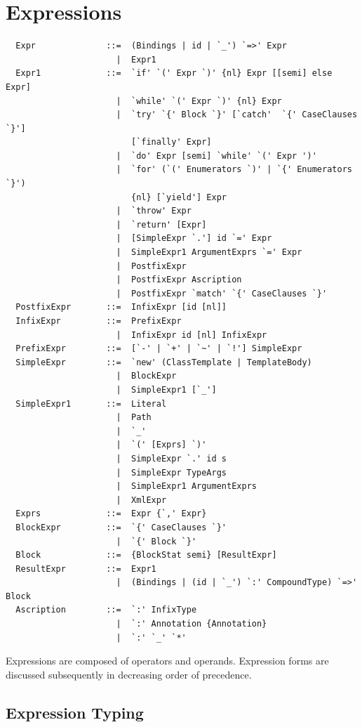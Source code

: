 \chapter{Expressions}
\label{sec:exprs}

\syntax\begin{lstlisting}
  Expr              ::=  (Bindings | id | `_') `=>' Expr
                      |  Expr1
  Expr1             ::=  `if' `(' Expr `)' {nl} Expr [[semi] else Expr]
                      |  `while' `(' Expr `)' {nl} Expr
                      |  `try' `{' Block `}' [`catch'  `{' CaseClauses `}'] 
                         [`finally' Expr]
                      |  `do' Expr [semi] `while' `(' Expr ')'
                      |  `for' (`(' Enumerators `)' | `{' Enumerators `}') 
                         {nl} [`yield'] Expr
                      |  `throw' Expr
                      |  `return' [Expr]
                      |  [SimpleExpr `.'] id `=' Expr
                      |  SimpleExpr1 ArgumentExprs `=' Expr
                      |  PostfixExpr
                      |  PostfixExpr Ascription
                      |  PostfixExpr `match' `{' CaseClauses `}'
  PostfixExpr       ::=  InfixExpr [id [nl]]
  InfixExpr         ::=  PrefixExpr
                      |  InfixExpr id [nl] InfixExpr
  PrefixExpr        ::=  [`-' | `+' | `~' | `!'] SimpleExpr 
  SimpleExpr        ::=  `new' (ClassTemplate | TemplateBody)
                      |  BlockExpr
                      |  SimpleExpr1 [`_']
  SimpleExpr1       ::=  Literal
                      |  Path
                      |  `_'
                      |  `(' [Exprs] `)'
                      |  SimpleExpr `.' id s
                      |  SimpleExpr TypeArgs
                      |  SimpleExpr1 ArgumentExprs
                      |  XmlExpr
  Exprs             ::=  Expr {`,' Expr}
  BlockExpr         ::=  `{' CaseClauses `}'
                      |  `{' Block `}'
  Block             ::=  {BlockStat semi} [ResultExpr]
  ResultExpr        ::=  Expr1
                      |  (Bindings | (id | `_') `:' CompoundType) `=>' Block
  Ascription        ::=  `:' InfixType
                      |  `:' Annotation {Annotation} 
                      |  `:' `_' `*'
\end{lstlisting}

Expressions are composed of operators and operands. Expression forms are
discussed subsequently in decreasing order of precedence. 

\section{Expression Typing}\label{sec:expr-typing}

